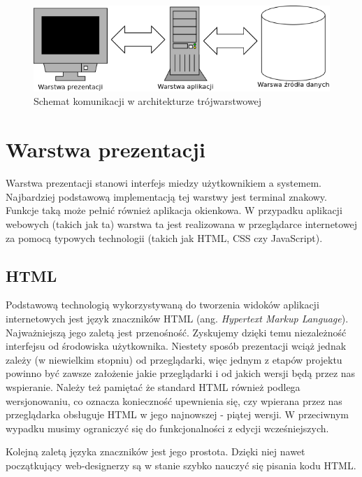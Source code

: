 \begin{figure}[tdh]
    \begin{center}
	\includegraphics[scale=.7 ]{img/warstwy.png}
	\caption{Schemat komunikacji w architekturze trójwarstwowej}
	\label{warstwy}
    \end{center}
\end{figure}


\section[Warstwa prezentacji][Warstwa prezentacji]{Warstwa prezentacji}
Warstwa prezentacji stanowi interfejs miedzy użytkownikiem a systemem. Najbardziej podstawową implementacją tej warstwy jest terminal znakowy. Funkcje taką może pełnić również aplikacja okienkowa. W przypadku aplikacji webowych (takich jak ta) warstwa ta jest realizowana w przeglądarce internetowej za pomocą typowych technologii (takich jak HTML, CSS czy JavaScript).

\subsection[HTML][HTML]{HTML}
Podstawową technologią wykorzystywaną do tworzenia widoków aplikacji internetowych jest język znaczników HTML (ang. \textit{Hypertext Markup Language}). Najważniejszą jego zaletą jest przenośność. Zyskujemy dzięki temu niezależność interfejsu od środowiska użytkownika. Niestety sposób prezentacji wciąż jednak zależy (w niewielkim stopniu) od przeglądarki, więc jednym z etapów projektu powinno być zawsze założenie jakie przeglądarki i od jakich wersji będą przez nas wspieranie. Należy też pamiętać że standard HTML również podlega wersjonowaniu, co oznacza konieczność upewnienia się, czy wpierana przez nas przeglądarka obsługuje HTML w jego najnowszej - piątej wersji. W przeciwnym wypadku musimy ograniczyć się do funkcjonalności z edycji wcześniejszych.

Kolejną zaletą języka znaczników jest jego prostota. Dzięki niej nawet początkujący web-designerzy są w stanie szybko nauczyć się pisania kodu HTML.

